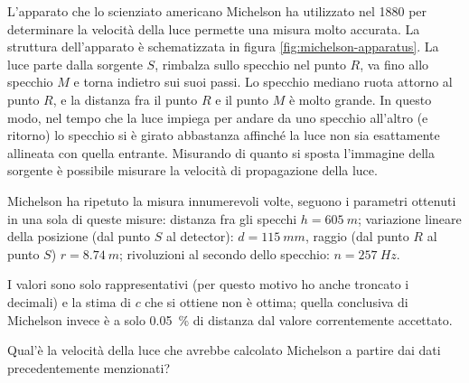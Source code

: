 \documentclass[a4paper,12pt]{article}
\begin{document}
\begin{exo}


L'apparato che lo scienziato americano Michelson ha utilizzato nel 1880 \cite[]{michelsonExperimentalDeterminationVelocity1880} per determinare la velocità della luce permette una misura molto accurata.
La struttura dell'apparato è schematizzata in figura \ref{fig:michelson-apparatus}.
La luce parte dalla sorgente \(S\), rimbalza sullo specchio nel punto \(R\), va fino allo specchio \(M\) e torna indietro sui suoi passi.
Lo specchio mediano ruota attorno al punto \(R\), e la distanza fra il punto \(R\) e il punto \(M\) è molto grande.
In questo modo, nel tempo che la luce impiega per andare da uno specchio all'altro (e ritorno) lo specchio si è girato abbastanza affinché la luce non sia esattamente allineata con quella entrante. 
Misurando di quanto si sposta l'immagine della sorgente è possibile misurare la velocità di propagazione della luce.

Michelson ha ripetuto la misura innumerevoli volte, seguono i parametri ottenuti in una sola di queste misure: distanza fra gli specchi \(h = \SI{605}{m}\); variazione lineare della posizione (dal punto \(S\) al detector): \(d = \SI{115}{mm}\), raggio (dal punto \(R\) al punto \(S\)) \(r = \SI{8.74}{m}\); rivoluzioni al secondo dello specchio: \(n = \SI{257}{Hz}\).

I valori sono solo rappresentativi (per questo motivo ho anche troncato i decimali) e la stima di \(c\) che si ottiene non è ottima; quella conclusiva di Michelson invece è a solo \SI{.05}{\percent} di distanza dal valore correntemente accettato.

Qual'è la velocità della luce che avrebbe calcolato Michelson a partire dai dati precedentemente menzionati?

\end{exo}
\end{document}
